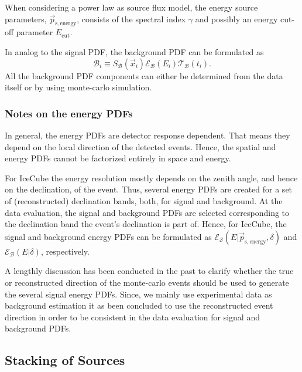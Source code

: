 \documentclass{article}
\begin{document}
When considering a power law as source flux model, the energy source parameters,
$\vec{p}_{\mathrm{s,energy}}$, consists of the spectral index $\gamma$ and possibly
an energy cut-off parameter $E_{\mathrm{cut}}$.

In analog to the signal PDF, the background PDF can be formulated as
\begin{equation}
 \mathcal{B}_i \equiv S_{\mathcal{B}}(\vec{x}_i) \mathcal{E}_{\mathcal{B}}(E_i) \mathcal{T}_{\mathcal{B}}(t_i).
 \label{eq:Bi}
\end{equation}
All the background PDF components can either be determined from the data itself
or by using monte-carlo simulation.

\subsubsection{Notes on the energy PDFs}

In general, the energy PDFs are detector response dependent. That means they
depend on the local direction of the detected events. Hence, the spatial and
energy PDFs cannot be factorized entirely in space and energy.

For IceCube the energy resolution mostly depends on the zenith angle, and hence
on the declination, of the event. Thus, several energy PDFs are created for a
set of (reconstructed) declination bands, both, for signal and background. At
the data evaluation, the signal and background PDFs are selected corresponding
to the declination band the event's declination is part of. Hence, for IceCube,
the signal and background energy PDFs can be formulated as
$\mathcal{E}_{\mathcal{S}}(E|\vec{p}_{\mathrm{s,energy}},\delta)$ and
$\mathcal{E}_{\mathcal{B}}(E|\delta)$, respectively.

A lengthly discussion has been conducted in the past to clarify whether the true or
reconstructed direction of the monte-carlo events should be used to generate
the several signal energy PDFs. Since, we mainly use experimental data as
background estimation it as been concluded to use the reconstructed event
direction in order to be consistent in the data evaluation for signal and
background PDFs.

\subsection{Stacking of Sources}
\end{document}
